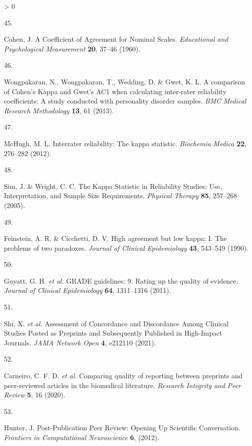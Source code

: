 \documentclass[a4paper, twoside]{templates/ociamthesis}
\newlength{\cslhangindent}
\newlength{\csllabelwidth}
\newenvironment{CSLReferences}[3] %
 {%
  \setlength{\parindent}{0pt}
  \ifodd #1 \everypar{\setlength{\hangindent}{\cslhangindent}}\ignorespaces\fi
  \ifnum #2 > 0
  \setlength{\parskip}{#2\baselineskip}
  \fi
 }%
 {}
\newcommand{\CSLLeftMargin}[1]{\parbox[t]{\maxof{\widthof{#1}}{\csllabelwidth}}{#1}}
\newcommand{\CSLRightInline}[1]{\parbox[t]{\linewidth - \csllabelwidth}{#1}}
\begin{document}
\begin{CSLReferences}{0}{0}
\leavevmode\hypertarget{ref-cohen1960}{}%
\CSLLeftMargin{45. }
\CSLRightInline{Cohen, J. A {Coefficient} of {Agreement} for {Nominal Scales}. \emph{Educational and Psychological Measurement} \textbf{20}, 37--46 (1960).}

\leavevmode\hypertarget{ref-wongpakaran2013}{}%
\CSLLeftMargin{46. }
\CSLRightInline{Wongpakaran, N., Wongpakaran, T., Wedding, D. \& Gwet, K. L. A comparison of {Cohen}'s {Kappa} and {Gwet}'s {AC1} when calculating inter-rater reliability coefficients: A study conducted with personality disorder samples. \emph{BMC Medical Research Methodology} \textbf{13}, 61 (2013).}

\leavevmode\hypertarget{ref-mchugh2012}{}%
\CSLLeftMargin{47. }
\CSLRightInline{McHugh, M. L. Interrater reliability: The kappa statistic. \emph{Biochemia Medica} \textbf{22}, 276--282 (2012).}

\leavevmode\hypertarget{ref-sim2005}{}%
\CSLLeftMargin{48. }
\CSLRightInline{Sim, J. \& Wright, C. C. The {Kappa Statistic} in {Reliability Studies}: {Use}, {Interpretation}, and {Sample Size Requirements}. \emph{Physical Therapy} \textbf{85}, 257--268 (2005).}

\leavevmode\hypertarget{ref-feinstein1990}{}%
\CSLLeftMargin{49. }
\CSLRightInline{Feinstein, A. R. \& Cicchetti, D. V. High agreement but low kappa: {I}. {The} problems of two paradoxes. \emph{Journal of Clinical Epidemiology} \textbf{43}, 543--549 (1990).}

\leavevmode\hypertarget{ref-guyatt2011}{}%
\CSLLeftMargin{50. }
\CSLRightInline{Guyatt, G. H. \emph{et al.} {GRADE} guidelines: 9. {Rating} up the quality of evidence. \emph{Journal of Clinical Epidemiology} \textbf{64}, 1311--1316 (2011).}

\leavevmode\hypertarget{ref-shi2021}{}%
\CSLLeftMargin{51. }
\CSLRightInline{Shi, X. \emph{et al.} Assessment of {Concordance} and {Discordance Among Clinical Studies Posted} as {Preprints} and {Subsequently Published} in {High}-{Impact Journals}. \emph{JAMA Network Open} \textbf{4}, e212110 (2021).}

\leavevmode\hypertarget{ref-carneiro2020}{}%
\CSLLeftMargin{52. }
\CSLRightInline{Carneiro, C. F. D. \emph{et al.} Comparing quality of reporting between preprints and peer-reviewed articles in the biomedical literature. \emph{Research Integrity and Peer Review} \textbf{5}, 16 (2020).}

\leavevmode\hypertarget{ref-hunter2012}{}%
\CSLLeftMargin{53. }
\CSLRightInline{Hunter, J. Post-{Publication Peer Review}: {Opening Up Scientific Conversation}. \emph{Frontiers in Computational Neuroscience} \textbf{6}, (2012).}


\end{CSLReferences}
\end{document}
